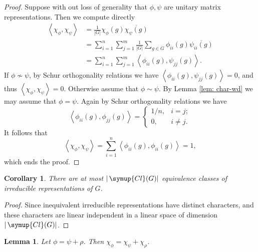 \documentclass{assignment}[2019/10/15]
\newcommand{\lr}[3]{\left#1#3\right#2}
\theoremstyle{plain}
\newtheorem{lemma}[theorem]{Lemma}
\newtheorem{corollary}[theorem]{Corollary}
\newcommand{\Cl}{\mathop{}\!\symup{Cl}}
\numberwithin{equation}{section}
\begin{document}
    \begin{proof}
        Suppose with out loss of generality that $\phi, \psi$ are unitary matrix representations. Then we compute directly
        \begin{equation}
            \begin{aligned}
                \lr<>{\chi_\phi, \chi_\psi}
                &= \frac{1}{|G|}\chi_\phi(g)\overline{\chi_\psi(g)}\\
                &= \sum_{i=1}^n\sum_{j=1}^m\frac{1}{|G|}\sum_{g\in G}\phi_{ii}(g)\overline{\psi_{ii}(g)}\\
                &= \sum_{i=1}^n\sum_{j=1}^m \lr<>{\phi_{ii}(g), \psi_{jj}(g)}.
            \end{aligned}
        \end{equation}
        If $\phi\nsim\psi$, by Schur orthogonality relations we have $\lr<>{\phi_{ii}(g), \psi_{jj}(g)}=0$, and thus $\lr<>{\chi_\phi, \chi_\psi}=0$. Otherwise assume that $\phi\sim\psi$. By Lemma \ref{lem: char-wd} we may assume that $\phi=\psi$. Again by Schur orthogonality relations we have
        \begin{equation}
            \lr<>{\phi_{ii}(g), \phi_{jj}(g)}=
            \begin{cases}
                1/n, &i=j;\\
                0, &i\neq j.
            \end{cases}
        \end{equation}
        It follows that
        \begin{equation}
            \lr<>{\chi_\phi, \chi_\psi}=\sum_{i=1}^n\lr<>{\phi_{ii}(g), \phi_{ii}(g)}=1,
        \end{equation}
        which ends the proof.
    \end{proof}

    \begin{corollary}
        There are at most $|\Cl(G)|$ equivalence classes of irreducible representations of $G$.
    \end{corollary}

    \begin{proof}
        Since inequivalent irreducible representations have distinct characters, and these characters are linear independent in a linear space of dimension $|\Cl(G)|$.
    \end{proof}

    \begin{lemma}
        Let $\phi = \psi+\rho$. Then $\chi_\phi = \chi_\psi + \chi_\rho$.
    \end{lemma}
\end{document}
